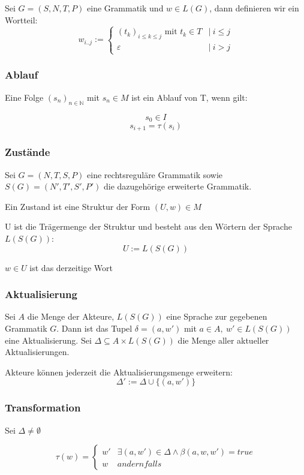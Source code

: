 \documentclass[]{article}
\begin{document}
Sei $G=(S,N,T,P)$ eine Grammatik und $w\in L(G)$, dann definieren wir ein Wortteil: 
\[ 
w_{i..j} := 
\begin{cases}
  (t_k)_{i\leq k \leq j}\text{ mit }t_k\in T &|\ i\leq j \\
  \varepsilon &|\ i>j
\end{cases}
\] 


\subsubsection*{Ablauf}
Eine Folge $(s_n)_{n\in\mathbb{N}}$ mit $s_n\in M$ ist ein Ablauf von T, wenn gilt:

\[ s_0 \in I \] 
\[ s_{i+1} = \tau(s_i) \] 

\subsubsection*{Zustände}

Sei $G = (N,T,S,P)$ eine rechtsreguläre Grammatik sowie
$S(G)=(N',T',S',P')$ die dazugehörige erweiterte Grammatik.

Ein Zustand ist eine Struktur der Form $(U, w) \in M$

U ist die Trägermenge der Struktur und besteht aus den Wörtern der Sprache $L(S(G))$:
\[U := L(S(G))\]

$w\in U$ ist das derzeitige Wort

\subsubsection*{Aktualisierung}
Sei $A$ die Menge der Akteure, $L(S(G))$ eine Sprache zur gegebenen Grammatik $G$. Dann ist das Tupel $\delta = (a,w')$ mit $a\in A,\ w'\in L(S(G))$ eine Aktualisierung. Sei $\Delta \subseteq A\times L(S(G))$ die Menge aller aktueller Aktualisierungen.

Akteure können jederzeit die Aktualisierungsmenge erweitern: 
\[ \Delta' := \Delta \cup \{(a,w')\} \] 


\subsubsection*{Transformation}
Sei $\Delta \neq \emptyset$ 

\[
  \tau( w ) = 
  \begin{cases}
    w'  & \exists (a,w') \in \Delta \land \beta(a,w,w') = true \\
    w   & andernfalls 
  \end{cases}
\] 
\end{document}
